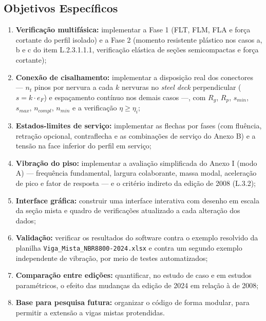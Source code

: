 \subsection{Objetivos Específicos}\label{sec:1.3.2}
\begin{enumerate}
\item \textbf{Verificação multifásica:} implementar a Fase 1 (FLT, FLM, FLA e força cortante do perfil isolado) e a Fase 2 (momento resistente plástico nos casos a, b e c do item L.2.3.1.1.1, verificação elástica de seções semicompactas e força cortante);
\item \textbf{Conexão de cisalhamento:} implementar a disposição real dos conectores --- $n_t$ pinos por nervura a cada $k$ nervuras no \emph{steel deck} perpendicular ($s = k \cdot e_F$) e espaçamento contínuo nos demais casos ---, com $R_g$, $R_p$, $s_{min}$, $s_{max}$, $n_{compl}$, $n_{min}$ e a verificação $\eta \ge \eta_i$;
\item \textbf{Estados-limites de serviço:} implementar as flechas por fases (com fluência, retração opcional, contraflecha e as combinações de serviço do Anexo B) e a tensão na face inferior do perfil em serviço;
\item \textbf{Vibração do piso:} implementar a avaliação simplificada do Anexo I (modo A) --- frequência fundamental, largura colaborante, massa modal, aceleração de pico e fator de resposta --- e o critério indireto da edição de 2008 (L.3.2);
\item \textbf{Interface gráfica:} construir uma interface interativa com desenho em escala da seção mista e quadro de verificações atualizado a cada alteração dos dados;
\item \textbf{Validação:} verificar os resultados do software contra o exemplo resolvido da planilha \texttt{Viga\_Mista\_NBR8800-2024.xlsx} e contra um segundo exemplo independente de vibração, por meio de testes automatizados;
\item \textbf{Comparação entre edições:} quantificar, no estudo de caso e em estudos paramétricos, o efeito das mudanças da edição de 2024 em relação à de 2008;
\item \textbf{Base para pesquisa futura:} organizar o código de forma modular, para permitir a extensão a vigas mistas protendidas.
\end{enumerate}

